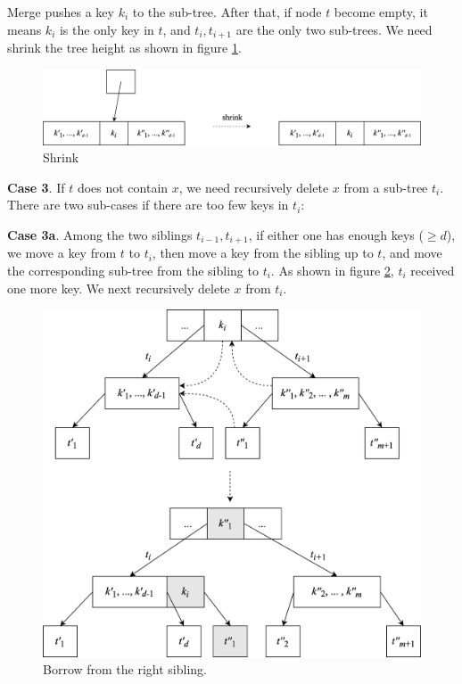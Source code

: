 \documentclass[b5paper]{article}
\begin{document}
Merge pushes a key $k_i$ to the sub-tree. After that, if node $t$ become empty, it means $k_i$ is the only key in $t$, and $t_i, t_{i+1}$ are the only two sub-trees. We need shrink the tree height as shown in figure \ref{fig:btree-del-shrink}.

\begin{figure}[htbp]
  \centering
  \includegraphics[scale=0.65]{img/btree-del-shrink.png}
  \caption{Shrink}
  \label{fig:btree-del-shrink}
\end{figure}

\textbf{Case 3}. If $t$ does not contain $x$, we need recursively delete $x$ from a sub-tree $t_i$. There are two sub-cases if there are too few keys in $t_i$:

\textbf{Case 3a}. Among the two siblings $t_{i-1}, t_{i+1}$, if either one has enough keys ($\geq d$), we move a key from $t$ to $t_i$, then move a key from the sibling up to $t$, and move the corresponding sub-tree from the sibling to $t_i$. As shown in figure \ref{fig:btree-del-borrow}, $t_i$ received one more key. We next recursively delete $x$ from $t_i$.

\begin{figure}[htbp]
  \centering
  \includegraphics[scale=0.65]{img/btree-del-borrow.png}
  \caption{Borrow from the right sibling.}
  \label{fig:btree-del-borrow}
\end{figure}
\end{document}
